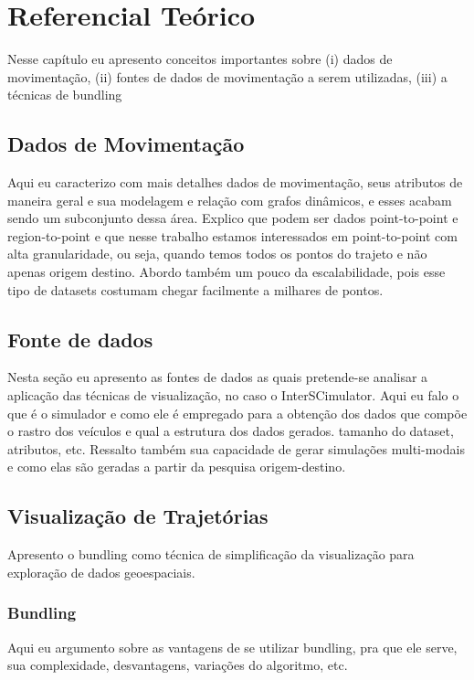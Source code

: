 \chapter{Referencial Teórico}
\label{cap:referencial-teorico}

Nesse capítulo eu apresento conceitos importantes sobre (i) dados de
movimentação, (ii) fontes de dados de movimentação a serem utilizadas, (iii) a
técnicas de bundling 

\section{Dados de Movimentação}

  Aqui eu caracterizo com mais detalhes dados de movimentação, seus atributos de
maneira geral e sua modelagem e relação com grafos dinâmicos, e esses acabam
sendo um subconjunto dessa área. Explico que podem ser dados
point-to-point e region-to-point e que nesse trabalho estamos interessados em
point-to-point com alta granularidade, ou seja, quando temos todos os pontos do
trajeto e não apenas origem destino. Abordo também um pouco da escalabilidade, pois
esse tipo de datasets costumam chegar facilmente a milhares de pontos.

\section{Fonte de dados}
  Nesta seção eu apresento as fontes de dados as quais pretende-se analisar a
aplicação das técnicas de visualização, no caso o InterSCimulator. 
  Aqui eu falo o que é o simulador e como ele é empregado para a obtenção dos
dados que compõe o rastro dos veículos e qual a estrutura dos dados gerados.
tamanho do dataset, atributos, etc. Ressalto também sua capacidade de gerar simulações multi-modais e como elas são
geradas a partir da pesquisa origem-destino.

\section{Visualização de Trajetórias}
  Apresento o bundling como técnica de simplificação da visualização  para exploração
de dados geoespaciais.

\subsection{Bundling}
    Aqui eu argumento sobre as vantagens de se utilizar bundling, pra que ele serve,
sua complexidade, desvantagens, variações do algoritmo, etc.

